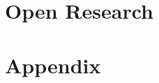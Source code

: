 \documentclass[draft]{agujournal2019}
\begin{document}
%
%



\section{Open Research}



%



\newpage
\section*{Appendix}
\setcounter{figure}{0}
\renewcommand{\thefigure}{A\arabic{figure}}
\end{document}
